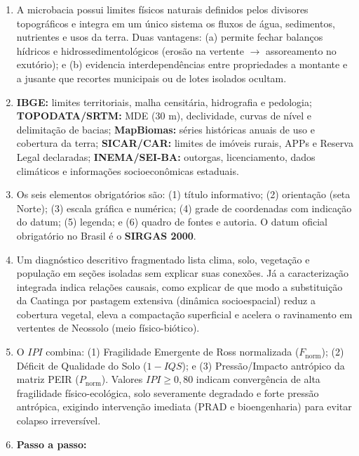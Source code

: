\clearpage
{}

\begin{boxGabarito}
\begin{enumerate}[leftmargin=1.6em, itemsep=4pt]
  \item A microbacia possui limites físicos naturais definidos pelos divisores topográficos e integra em um único sistema os fluxos de água, sedimentos, nutrientes e usos da terra. Duas vantagens: (a) permite fechar balanços hídricos e hidrossedimentológicos (erosão na vertente $\rightarrow$ assoreamento no exutório); e (b) evidencia interdependências entre propriedades a montante e a jusante que recortes municipais ou de lotes isolados ocultam.
  \item \textbf{IBGE:} limites territoriais, malha censitária, hidrografia e pedologia; \textbf{TOPODATA/SRTM:} MDE ($30\text{ m}$), declividade, curvas de nível e delimitação de bacias; \textbf{MapBiomas:} séries históricas anuais de uso e cobertura da terra; \textbf{SICAR/CAR:} limites de imóveis rurais, APPs e Reserva Legal declaradas; \textbf{INEMA/SEI-BA:} outorgas, licenciamento, dados climáticos e informações socioeconômicas estaduais.
  \item Os seis elementos obrigatórios são: (1) título informativo; (2) orientação (seta Norte); (3) escala gráfica e numérica; (4) grade de coordenadas com indicação do datum; (5) legenda; e (6) quadro de fontes e autoria. O datum oficial obrigatório no Brasil é o \textbf{SIRGAS 2000}.
  \item Um diagnóstico descritivo fragmentado lista clima, solo, vegetação e população em seções isoladas sem explicar suas conexões. Já a caracterização integrada indica relações causais, como explicar de que modo a substituição da Caatinga por pastagem extensiva (dinâmica socioespacial) reduz a cobertura vegetal, eleva a compactação superficial e acelera o ravinamento em vertentes de Neossolo (meio físico-biótico).
  \item O $IPI$ combina: (1) Fragilidade Emergente de Ross normalizada ($F_{\text{norm}}$); (2) Déficit de Qualidade do Solo ($1 - IQS$); e (3) Pressão/Impacto antrópico da matriz PEIR ($P_{\text{norm}}$). Valores $IPI \ge 0{,}80$ indicam convergência de alta fragilidade físico-ecológica, solo severamente degradado e forte pressão antrópica, exigindo intervenção imediata (PRAD e bioengenharia) para evitar colapso irreversível.
  \item \textbf{Passo a passo:}

\end{enumerate}
\end{boxGabarito}
